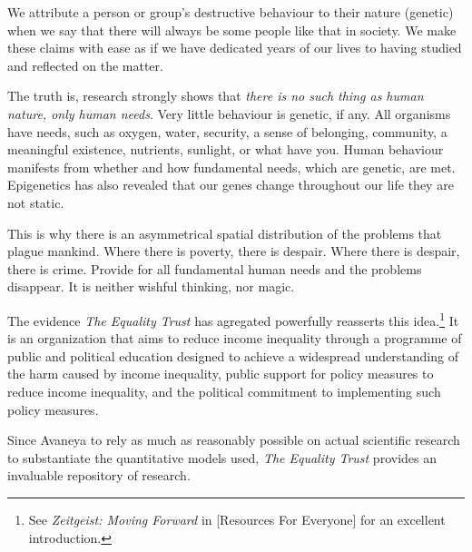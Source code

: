 

We attribute a person or group's destructive behaviour to their nature (genetic) when we say that there will always be some people like that in society. We make these claims with ease as if we have dedicated years of our lives to having studied and reflected on the matter.

The truth is, research strongly shows that {\it there is no such thing as human nature, only human needs}. Very little behaviour is genetic, if any. All organisms have needs, such as oxygen, water, security, a sense of belonging, community, a meaningful existence, nutrients, sunlight, or what have you. Human behaviour manifests from whether and how fundamental needs, which are genetic, are met. Epigenetics has also revealed that our genes change throughout our life they are not static.

This is why there is an asymmetrical spatial distribution of the problems that plague mankind. Where there is poverty, there is despair. Where there is despair, there is crime. Provide for all fundamental human needs and the problems disappear. It is neither wishful thinking, nor magic.

The evidence {\it The Equality Trust} has agregated powerfully reasserts this idea.\footnote{See {\it Zeitgeist: Moving Forward} in [Resources For Everyone] for an excellent introduction.} It is an organization that aims to reduce income inequality through a programme of public and political education designed to achieve a widespread understanding of the harm caused by income inequality, public support for policy measures to reduce income inequality, and the political commitment to implementing such policy measures. 

Since Avaneya to rely as much as reasonably possible on actual scientific research to substantiate the quantitative models used, {\it The Equality Trust} provides an invaluable repository of research.

\startnarrower[3*left]
\stopnarrower

